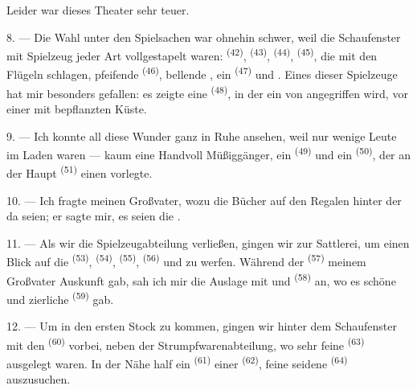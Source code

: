 Leider war dieses Theater sehr teuer.

8. --- Die Wahl unter den Spielsachen war ohnehin schwer, weil die Schaufenster mit
Spielzeug jeder Art vollgestapelt waren:  \textsuperscript{(42)},
 \textsuperscript{(43)},  \textsuperscript{(44)},
 \textsuperscript{(45)}, die mit den Flügeln schlagen, pfeifende
 \textsuperscript{(46)}, bellende , ein
 \textsuperscript{(47)} und . Eines dieser
Spielzeuge hat mir besonders gefallen: es zeigte eine 
\textsuperscript{(48)}, in der ein  von 
angegriffen wird, vor einer mit  bepflanzten Küste.


9. --- Ich konnte all diese Wunder ganz in Ruhe ansehen, weil nur wenige Leute im
Laden waren --- kaum eine Handvoll Müßiggänger, ein 
\textsuperscript{(49)} und ein  \textsuperscript{(50)}, der an der
Haupt \textsuperscript{(51)} einen  vorlegte.

10. --- Ich fragte meinen Großvater, wozu die Bücher auf den Regalen hinter der
 da seien; er sagte mir, es seien die .

\VUsaut{3.6mm}
\VUsaut{2.8mm}

11. --- Als wir die Spielzeugabteilung verließen, gingen wir zur Sattlerei, um einen
Blick auf die  \textsuperscript{(53)}, 
\textsuperscript{(54)},  \textsuperscript{(55)}, 
\textsuperscript{(56)} und  zu werfen. Während der
 \textsuperscript{(57)} meinem Großvater Auskunft gab, sah
ich mir die Auslage mit  und 
\textsuperscript{(58)} an, wo es schöne  und zierliche
 \textsuperscript{(59)} gab.

12. --- Um in den ersten Stock zu kommen, gingen wir hinter dem Schaufenster mit den
 \textsuperscript{(60)} vorbei, neben der Strumpfwarenabteilung, wo
sehr feine  \textsuperscript{(63)} ausgelegt waren. In der Nähe
half ein  \textsuperscript{(61)} einer 
\textsuperscript{(62)}, feine seidene  \textsuperscript{(64)}
auszusuchen.

